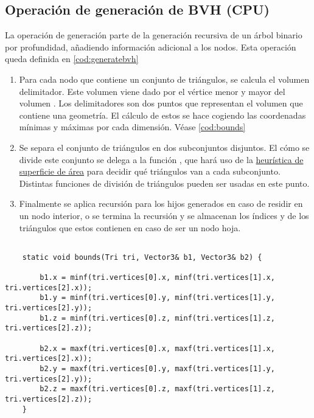 \subsection{Operación de generación de BVH (CPU)}

La operación de generación parte de la generación recursiva de un árbol binario por profundidad, añadiendo información adicional a los nodos. Esta operación queda definida en \autoref{cod:generatebvh}

\begin{enumerate}
	
\item Para cada nodo que contiene un conjunto de triángulos, se calcula el volumen delimitador. Este volumen viene dado por el vértice menor y mayor del volumen . 
Los delimitadores son dos puntos que representan el volumen que contiene una geometría. El cálculo de estos se hace cogiendo las coordenadas mínimas y máximas por cada dimensión. Véase \autoref{cod:bounds}

\item Se separa el conjunto de triángulos en dos subconjuntos disjuntos. El cómo se divide este conjunto se delega a la función , que hará uso de la \hyperref[sub:sah]{heurística de superficie de área} para decidir qué triángulos van a cada subconjunto. Distintas funciones de división de triángulos pueden ser usadas en este punto.

\item Finalmente se aplica recursión para los hijos generados en caso de residir en un nodo interior, o se termina la recursión y se almacenan los índices  y  de los triángulos que estos contienen en caso de ser un nodo hoja.

\end{enumerate}

\begin{minipage}[c]{0.95\textwidth}
	\begin{lstlisting}[label={cod:bounds}, caption={Cálculo de delimitadores}]

	static void bounds(Tri tri, Vector3& b1, Vector3& b2) {

		b1.x = minf(tri.vertices[0].x, minf(tri.vertices[1].x, tri.vertices[2].x));
		b1.y = minf(tri.vertices[0].y, minf(tri.vertices[1].y, tri.vertices[2].y));
		b1.z = minf(tri.vertices[0].z, minf(tri.vertices[1].z, tri.vertices[2].z));

		b2.x = maxf(tri.vertices[0].x, maxf(tri.vertices[1].x, tri.vertices[2].x));
		b2.y = maxf(tri.vertices[0].y, maxf(tri.vertices[1].y, tri.vertices[2].y));
		b2.z = maxf(tri.vertices[0].z, maxf(tri.vertices[1].z, tri.vertices[2].z));
	}
	
\end{lstlisting}
\end{minipage}

